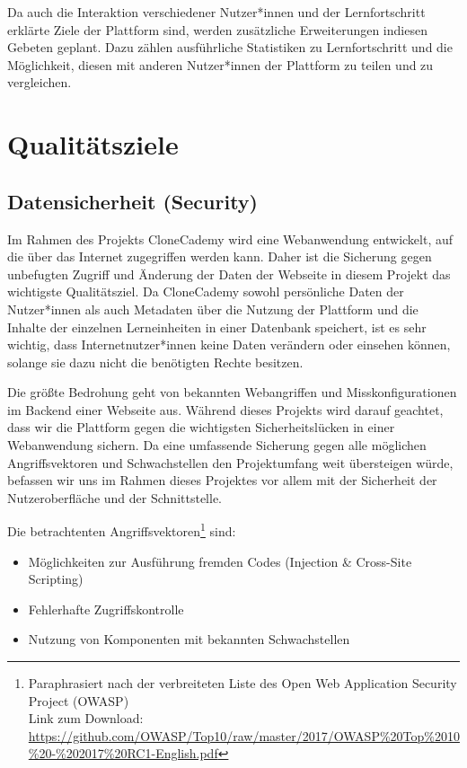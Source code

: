 \documentclass[accentcolor=tud0b,12pt,paper=a4]{tudreport}
\begin{document}
Da auch die Interaktion verschiedener Nutzer*innen und der Lernfortschritt erklärte Ziele der Plattform sind, werden zusätzliche Erweiterungen indiesen Gebeten geplant. Dazu zählen ausführliche Statistiken zu Lernfortschritt und die Möglichkeit, diesen mit anderen Nutzer*innen der Plattform zu teilen und zu vergleichen.

\chapter{Qualitätsziele}
\section{Datensicherheit (Security)}

Im Rahmen des Projekts CloneCademy wird eine Webanwendung entwickelt, auf die über das Internet zugegriffen werden kann. Daher ist die Sicherung gegen unbefugten Zugriff und Änderung der Daten der Webseite in diesem Projekt das wichtigste Qualitätsziel. Da CloneCademy sowohl persönliche Daten der Nutzer*innen als auch Metadaten über die Nutzung der Plattform und die Inhalte der einzelnen Lerneinheiten in einer Datenbank speichert, ist es sehr wichtig, dass Internetnutzer*innen keine Daten verändern oder einsehen können, solange sie dazu nicht die benötigten Rechte besitzen.

Die größte Bedrohung geht von bekannten Webangriffen und Misskonfigurationen im Backend einer Webseite aus. Während dieses Projekts wird darauf geachtet, dass wir die Plattform gegen die wichtigsten Sicherheitslücken in einer Webanwendung sichern. Da eine umfassende Sicherung gegen alle möglichen Angriffsvektoren und Schwachstellen den Projektumfang weit übersteigen würde, befassen wir uns im Rahmen dieses Projektes vor allem mit der Sicherheit der Nutzeroberfläche und der Schnittstelle.

Die betrachtenten Angriffsvektoren\footnote{Paraphrasiert nach der verbreiteten Liste des Open Web Application Security Project (OWASP)\\Link zum Download:  \href{https://github.com/OWASP/Top10/raw/master/2017/OWASP\%20Top\%2010\%20-\%202017\%20RC1-English.pdf}{https://github.com/OWASP/Top10/raw/master/2017/OWASP\%20Top\%2010\%20-\%202017\%20RC1-English.pdf}} sind:
\begin{itemize}
\item Möglichkeiten zur Ausführung fremden Codes (Injection \& Cross-Site Scripting)
\item Fehlerhafte Zugriffskontrolle
\item Nutzung von Komponenten mit bekannten Schwachstellen
\end{itemize}
\end{document}
